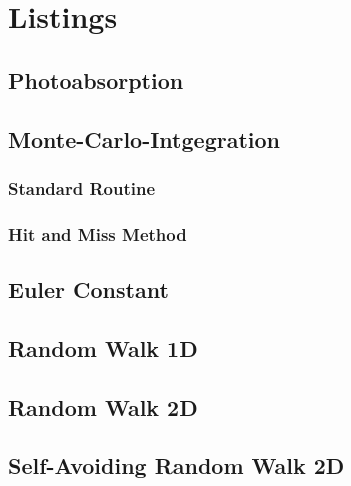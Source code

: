 %
%

\chapter{Listings}
\small

\section{Photoabsorption}

\section{Monte-Carlo-Intgegration}
\subsection{Standard Routine}
\subsection{Hit and Miss Method}

\section{Euler Constant}

\section{Random Walk 1D}

\section{Random Walk 2D}

\section{Self-Avoiding Random Walk 2D}
